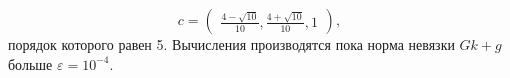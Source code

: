 \documentclass[a4paper, 14pt]{extreport} %
\begin{document}
$$c=\left(
\begin{array}{l}
\frac{4-\sqrt{10}}{10},
\frac{4+\sqrt{10}}{10},
1
\end{array}
\right),$$
порядок которого равен 5.  Вычисления производятся пока норма невязки $Gk+g$ больше $\varepsilon = 10^{-4}$.







\end{document}
